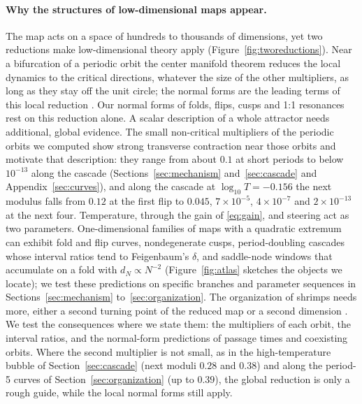 \documentclass[11pt,letterpaper]{article}
\begin{document}
\paragraph{Why the structures of low-dimensional maps appear.} The map acts on a space of hundreds to thousands of
dimensions, yet two reductions make low-dimensional theory apply (Figure~\ref{fig:tworeductions}). Near a bifurcation of a periodic orbit the center
manifold theorem reduces the local dynamics to the critical directions, whatever the size of the other multipliers,
as long as they stay off the unit circle; the normal forms are the leading terms of this local reduction
\cite{kuznetsov2023elements}. Our normal forms of folds, flips, cusps and 1:1 resonances rest on this
reduction alone. A scalar description of a whole attractor needs additional, global evidence. The small non-critical
multipliers of the periodic orbits we computed show strong transverse contraction near those orbits and motivate that
description: they range from about $0.1$ at short periods to below $10^{-13}$ along the cascade
(Sections~\ref{sec:mechanism} and~\ref{sec:cascade} and Appendix~\ref{sec:curves}), and along the cascade at $\log_{10}T=-0.156$ the next modulus
falls from $0.12$ at the first flip to $0.045$, $7\times10^{-5}$, $4\times10^{-7}$ and $2\times10^{-13}$ at the next
four. Temperature, through the gain of \eqref{eq:gain}, and steering act as two parameters. One-dimensional families of
maps with a quadratic extremum can exhibit fold and flip curves, nondegenerate cusps, period-doubling cascades whose
interval ratios tend to Feigenbaum's $\delta$, and saddle-node windows that accumulate on a fold with
$d_N\propto N^{-2}$ (Figure~\ref{fig:atlas} sketches the objects we locate); we test these predictions on specific branches and parameter sequences in Sections~\ref{sec:mechanism} to~\ref{sec:organization}. The organization of shrimps needs
more, either a second turning point of the reduced map or a second dimension
\cite{gallas1993structure,jones2012rossler}. We test the consequences where we state them: the multipliers of each
orbit, the interval ratios, and the normal-form predictions of passage times and coexisting orbits. Where the second
multiplier is not small, as in the high-temperature bubble of Section~\ref{sec:cascade} (next moduli $0.28$ and
$0.38$) and along the period-5 curves of Section~\ref{sec:organization} (up to $0.39$), the global reduction is only a rough guide, while the local normal forms still apply.
\end{document}
